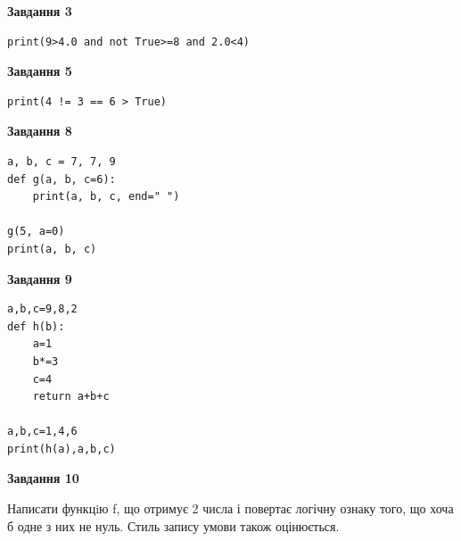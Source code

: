 \documentclass[12pt, ukrainian]{article}
\begin{document}
{\begin {large}
\begin{minipage}[t]{7.5cm}
\end{minipage}
\vline \hspace{6mm}
\begin{minipage}[t]{10.5cm}

\begin{center}
\textbf{Завдання 3}
\end{center}

\begin{verbatim}
print(9>4.0 and not True>=8 and 2.0<4)
\end{verbatim}



\begin{center}
\textbf{Завдання 5}
\end{center}

\begin{verbatim}
print(4 != 3 == 6 > True)
\end{verbatim}



\begin{center}
\textbf{Завдання 8}
\end{center}

\begin{verbatim}
a, b, c = 7, 7, 9
def g(a, b, c=6):
    print(a, b, c, end=" ")

g(5, a=0)
print(a, b, c)
\end{verbatim}



\begin{center}
\textbf{Завдання 9}
\end{center}

\begin{verbatim}
a,b,c=9,8,2
def h(b):
    a=1
    b*=3
    c=4
    return a+b+c

a,b,c=1,4,6
print(h(a),a,b,c)
\end{verbatim}



\begin{center}
\textbf{Завдання 10}
\end{center}

Написати функцiю f, що отримує 2 числа і повертає логічну ознаку того, що хоча б одне з них не нуль. Стиль запису умови також оцінюється.\par

\end{minipage}

\end {large}}
\newpage

\end{document}
